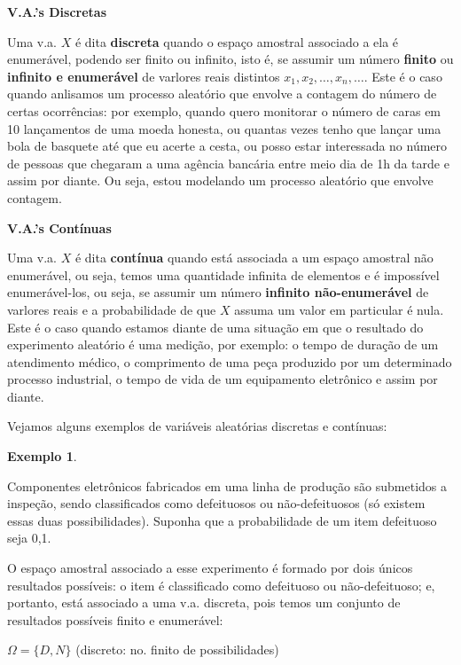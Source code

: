 \documentclass[
]{book}
\theoremstyle{definition}
\theoremstyle{definition}
\newtheorem{example}{Exemplo}[chapter]
\theoremstyle{definition}
\theoremstyle{remark}
\begin{document}
\textbf{V.A.'s Discretas}

Uma v.a. \(X\) é dita \textbf{discreta} quando o espaço amostral associado a ela é enumerável, podendo ser finito ou infinito, isto é, se assumir um número \textbf{finito} ou \textbf{infinito e enumerável} de varlores reais distintos \(x_1, x_2, \ldots, x_n, \ldots\). Este é o caso quando anlisamos um processo aleatório que envolve a contagem do número de certas ocorrências: por exemplo, quando quero monitorar o número de caras em 10 lançamentos de uma moeda honesta, ou quantas vezes tenho que lançar uma bola de basquete até que eu acerte a cesta, ou posso estar interessada no número de pessoas que chegaram a uma agência bancária entre meio dia de 1h da tarde e assim por diante. Ou seja, estou modelando um processo aleatório que envolve contagem.

\textbf{V.A.'s Contínuas}

Uma v.a. \(X\) é dita \textbf{contínua} quando está associada a um espaço amostral não enumerável, ou seja, temos uma quantidade infinita de elementos e é impossível enumerável-los, ou seja, se assumir um número \textbf{infinito não-enumerável} de varlores reais e a probabilidade de que \(X\) assuma um valor em particular é nula. Este é o caso quando estamos diante de uma situação em que o resultado do experimento aleatório é uma medição, por exemplo: o tempo de duração de um atendimento médico, o comprimento de uma peça produzido por um determinado processo industrial, o tempo de vida de um equipamento eletrônico e assim por diante.

Vejamos alguns exemplos de variáveis aleatórias discretas e contínuas:

\begin{example}
\protect\hypertarget{exm:unnamed-chunk-1}{}{\label{exm:unnamed-chunk-1} }
\end{example}

Componentes eletrônicos fabricados em uma linha de produção são submetidos a inspeção, sendo classificados como defeituosos ou não-defeituosos (só existem essas duas possibilidades). Suponha que a probabilidade de um item defeituoso seja 0,1.

O espaço amostral associado a esse experimento é formado por dois únicos resultados possíveis: o item é classificado como defeituoso ou não-defeituoso; e, portanto, está associado a uma v.a. discreta, pois temos um conjunto de resultados possíveis finito e enumerável:

\({\Omega = \{D, N\}}\) (discreto: no. finito de possibilidades)
\end{document}
